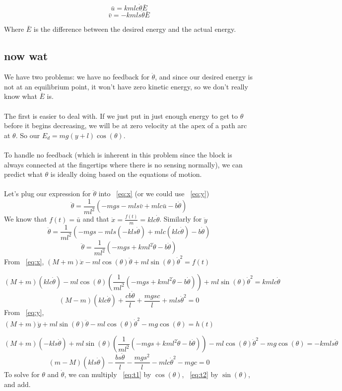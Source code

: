 \documentclass{article}
\begin{document}
$$
\bar{u} = kmlc\dot{\theta} \bar{E}
$$
$$
\bar{v} = -kmls\dot{\theta} \bar{E} 
$$

Where $\bar{E}$ is the difference between the desired energy and the actual energy.

\subsection{now wat}

We have two problems: we have no feedback for $\dot{\theta}$, and
since our desired energy is not at an equilibrium point, it won't have
zero kinetic energy, so we don't really know what $\bar{E}$ is. \\ \\
\noindent
The first is easier to deal with. If we just put in just enough energy
to get to $\theta$ before it begins decreasing, we will be at zero
velocity at the apex of a path arc at $\theta$. So our $E_d =
mg(y+l)\cos(\theta)$. \\ \\
\noindent 
To handle no feedback (which is inherent in this problem since the
block is always connected at the fingertips where there is no sensing
normally), we can predict what $\theta$ is ideally doing based on the
equations of motion. \\ \\
\noindent
Let's plug our expression for $\ddot{\theta}$ into ~\ref{eq:x} (or we could use ~\ref{eq:y})
$$
\ddot{\theta} = \frac{1}{ml^2} (-mgs -mls\bar{v} +mlc\bar{u} -b\dot{\theta})
$$
We know that $f(t) = \bar{u}$ and that $\ddot{x} = \frac{f(t)}{m} = klc\dot{\theta}$. Similarly for $\ddot{y}$
$$
\ddot{\theta} = \frac{1}{ml^2} (-mgs -mls(-kls\dot{\theta}) +mlc(klc\dot{\theta}) -b\dot{\theta})
$$
$$
\ddot{\theta} = \frac{1}{ml^2} (-mgs +kml^2\dot{\theta} -b\dot{\theta})
$$
\noindent
From ~\ref{eq:x}, $(M+m)\ddot{x} - ml\cos(\theta)\ddot{\theta} + ml\sin(\theta)\dot{\theta}^2 = f(t) $

$$
(M+m)(klc\dot{\theta}) - ml\cos(\theta)(\frac{1}{ml^2} (-mgs +kml^2\dot{\theta} -b\dot{\theta})) + ml\sin(\theta)\dot{\theta}^2 = kmlc\dot{\theta}
$$
\begin{equation} \label{eq:t1}
(M-m)(klc\dot{\theta}) + \frac{cb\dot{\theta}}{l} + \frac{mgsc}{l} + mls\dot{\theta}^2 = 0
\end{equation}
\noindent
From ~\ref{eq:y}, $(M+m)\ddot{y} + ml\sin(\theta)\ddot{\theta} - ml\cos(\theta)\dot{\theta}^2 - mg\cos(\theta) = h(t)$

$$
(M+m)(-kls\dot{\theta}) + ml\sin(\theta)(\frac{1}{ml^2} (-mgs +kml^2\dot{\theta} -b\dot{\theta})) - ml\cos(\theta)\dot{\theta}^2 - mg\cos(\theta) = -kmls\dot{\theta}
$$
\begin{equation} \label{eq:t2}
(m-M)(kls\dot{\theta}) - \frac{bs\dot{\theta}}{l} -\frac{mgs^2}{l} - mlc\dot{\theta}^2 - mgc = 0
\end{equation}
\noindent
To solve for $\theta$ and $\dot{\theta}$, we can multiply ~\ref{eq:t1} by $\cos(\theta)$, ~\ref{eq:t2} by $\sin(\theta)$, and add.
\end{document}
